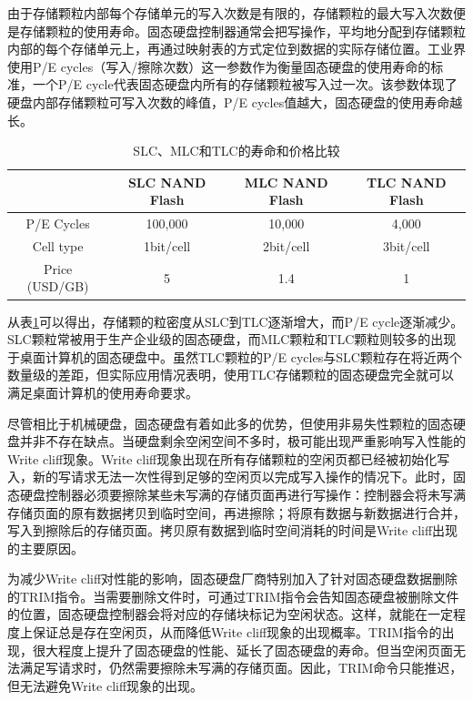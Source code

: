 由于存储颗粒内部每个存储单元的写入次数是有限的，存储颗粒的最大写入次数便是存储颗粒的使用寿命。固态硬盘控制器通常会把写操作，平均地分配到存储颗粒内部的每个存储单元上，再通过映射表的方式定位到数据的实际存储位置。工业界使用P/E cycles（写入/擦除次数）这一参数作为衡量固态硬盘的使用寿命的标准，一个P/E cycle代表固态硬盘内所有的存储颗粒被写入过一次。该参数体现了硬盘内部存储颗粒可写入次数的峰值，P/E cycles值越大，固态硬盘的使用寿命越长。

\begin{table}[H]
\centering
\caption{SLC、MLC和TLC的寿命和价格比较}
\begin{tabular}{|c|c|c|c|}
\hline  & SLC NAND Flash & MLC NAND Flash & TLC NAND Flash \\
\hline P/E Cycles & 100,000 & 10,000 & 4,000 \\
\hline Cell type & 1bit/cell & 2bit/cell & 3bit/cell \\
\hline Price (USD/GB) & 5 & 1.4 & 1 \\
\hline
\end{tabular}
\label{tab:slc-mlc-tlc-compare}
\end{table}

从表\ref{tab:slc-mlc-tlc-compare}可以得出，存储颗的粒密度从SLC到TLC逐渐增大，而P/E cycle逐渐减少。SLC颗粒常被用于生产企业级的固态硬盘，而MLC颗粒和TLC颗粒则较多的出现于桌面计算机的固态硬盘中。虽然TLC颗粒的P/E cycles与SLC颗粒存在将近两个数量级的差距，但实际应用情况表明，使用TLC存储颗粒的固态硬盘完全就可以满足桌面计算机的使用寿命要求。

尽管相比于机械硬盘，固态硬盘有着如此多的优势，但使用非易失性颗粒的固态硬盘并非不存在缺点。当硬盘剩余空闲空间不多时，极可能出现严重影响写入性能的Write cliff现象。Write cliff现象出现在所有存储颗粒的空闲页都已经被初始化写入，新的写请求无法一次性得到足够的空闲页以完成写入操作的情况下。此时，固态硬盘控制器必须要擦除某些未写满的存储页面再进行写操作：控制器会将未写满存储页面的原有数据拷贝到临时空间，再进擦除；将原有数据与新数据进行合并，写入到擦除后的存储页面。拷贝原有数据到临时空间消耗的时间是Write cliff出现的主要原因。

为减少Write cliff对性能的影响，固态硬盘厂商特别加入了针对固态硬盘数据删除的TRIM指令。当需要删除文件时，可通过TRIM指令会告知固态硬盘被删除文件的位置，固态硬盘控制器会将对应的存储块标记为空闲状态。这样，就能在一定程度上保证总是存在空闲页，从而降低Write cliff现象的出现概率。TRIM指令的出现，很大程度上提升了固态硬盘的性能、延长了固态硬盘的寿命。但当空闲页面无法满足写请求时，仍然需要擦除未写满的存储页面。因此，TRIM命令只能推迟，但无法避免Write cliff现象的出现。

